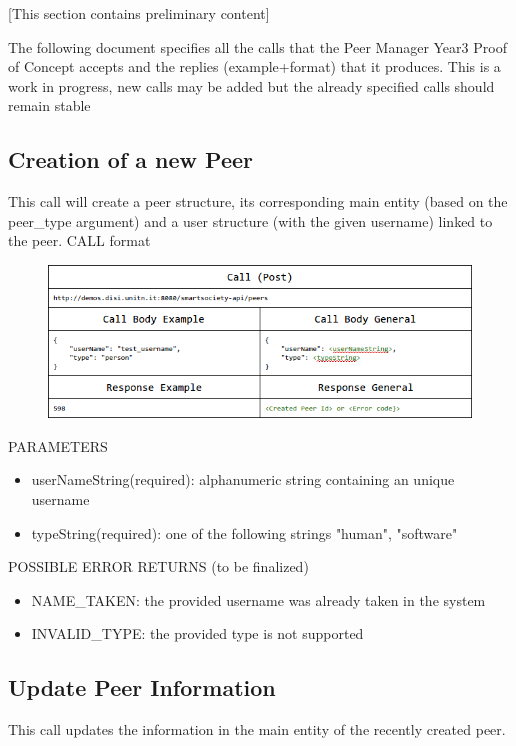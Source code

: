 [This section contains preliminary content]

The following document specifies all the calls that the Peer Manager Year3 Proof of Concept accepts and the replies (example+format)  that it produces.
This is a work in progress, new calls may be added but the already specified calls should remain stable

\subsection{Creation of a new Peer}
This call will create a peer structure, its corresponding main entity (based on the peer\_type argument) and a user structure (with the given username) linked to the peer. 
CALL format

\begin{figure}[htb!]
\centering
\includegraphics[width=1\linewidth]{figures/abs-new-peer.png}
\label{fig:abs-new-peer}
\end{figure}

PARAMETERS
\begin{itemize}
	\item userNameString(required): alphanumeric string containing an unique username
	\item typeString(required): one of the following strings "human", "software"
\end{itemize}

POSSIBLE ERROR RETURNS (to be finalized)
\begin{itemize}
	\item NAME\_TAKEN: the provided username was already taken in the system
	\item INVALID\_TYPE: the provided type is not supported
\end{itemize}

\subsection{Update Peer Information}
This call updates the information in the main entity of the recently created peer.

